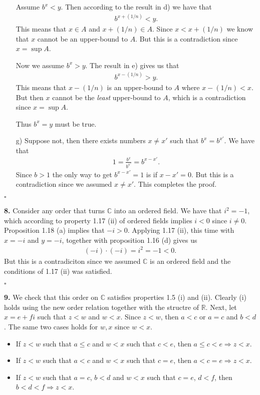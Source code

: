 \documentclass[11pt]{article}
\begin{document}
\begin{itemize}
  Assume $b^x < y$. Then according to the result in d) we have that
  \begin{align*}
    b^{x+(1/n)} < y.
  \end{align*}
  This means that $x\in A$ and $x + (1/n) \in A$.
  Since $x < x + (1/n)$ we know that $x$ cannot be an upper-bound to $A$.
  But this is a contradiction since $x=\sup{A}$.

  Now we assume $b^{x} > y$. The result in e) gives us that
  \begin{align*}
    b^{x - (1/n)} > y.
  \end{align*}
  This means that $x - (1/n)$ is an upper-bound to $A$ where $x - (1/n) < x$.
  But then $x$ cannot be the \emph{least} upper-bound to $A$, which is a contradiction since $x=\sup{A}$.

  Thus $b^x = y$ must be true.

\item [g)] Suppose not, then there exists numbers $x \neq x'$ such that $b^x = b^{x'}$.
  We have that
  \begin{align*}
    1 = \frac{b^x}{b^{x'}} = b^{x-x'}.
  \end{align*}
  Since $b > 1$ the only way to get $b^{x - x'} = 1$ is if $x - x' = 0$.
  But this is a contradiction since we assumed $x \neq x'$.
  This completes the proof.
\end{itemize}

\hfill$\square$

\noindent\textbf{8.} Consider any order that turns $\mathbb{C}$ into an ordered field.
We have that $i^2 = -1$, which according to property 1.17 (ii) of ordered fields implies $i < 0$ since $i \neq 0$.
Proposition 1.18 (a) implies that $-i > 0$.
Applying 1.17 (ii), this time with $x = -i$ and $y = -i$, together with proposition 1.16 (d) gives us
\begin{align*}
  (-i) \cdot (-i) = i^2 = -1 < 0.
\end{align*}
But this is a contradiciton since we assumed $\mathbb{C}$ is an ordered field and the conditions of 1.17 (ii) was satisfied.

\hfill$\square$

\noindent\textbf{9.} We check that this order on $\mathbb{C}$ satisfies properties 1.5 (i) and (ii).
Clearly (i) holds using the new order relation together with the structre of $\mathbb{R}$.
Next, let $x = e + fi$ such that $z < w$ and $w < x$.
Since $z < w$, then $a < c$ or $a = c$ and $b < d$.
The same two cases holds for $w, x$ since $w < x$.
\begin{itemize}
\item If $z < w$ such that $a \leq c$ and $w < x$ such that $c < e$, then $a \leq c < e \Rightarrow z < x$.

\item If $z < w$ such that $a < c$ and $w < x$ such that $c = e$, then $a < c = e \Rightarrow z < x$.

\item If $z < w$ such that $a = c$, $b < d$ and $w < x$ such that $c = e$, $d < f$, then $b < d < f \Rightarrow z < x$.
\end{itemize}
\end{document}

